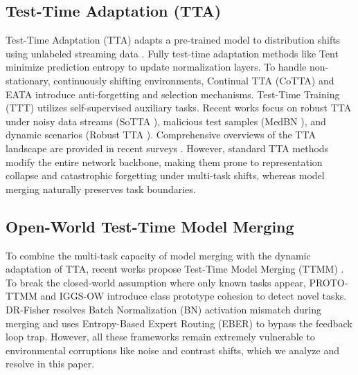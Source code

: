 \documentclass{article}
\theoremstyle{plain}
\theoremstyle{definition}
\theoremstyle{remark}
\begin{document}
\subsection{Test-Time Adaptation (TTA)}
Test-Time Adaptation (TTA) adapts a pre-trained model to distribution shifts using unlabeled streaming data \cite{wang2021tent, niu2022efficient}. Fully test-time adaptation methods like Tent \cite{wang2021tent} minimize prediction entropy to update normalization layers. To handle non-stationary, continuously shifting environments, Continual TTA (CoTTA) \cite{wang2022continual_cotta} and EATA \cite{niu2022efficient_eata} introduce anti-forgetting and selection mechanisms. Test-Time Training (TTT) \cite{sun2020test_ttt} utilizes self-supervised auxiliary tasks. Recent works focus on robust TTA under noisy data streams (SoTTA \cite{gong2023sotta}), malicious test samples (MedBN \cite{Park_2024_CVPR}), and dynamic scenarios (Robust TTA \cite{yuan2023robust_dynamic}). Comprehensive overviews of the TTA landscape are provided in recent surveys \cite{liang2024comprehensive, xiao2024beyond, wang2023search}. However, standard TTA methods modify the entire network backbone, making them prone to representation collapse and catastrophic forgetting under multi-task shifts, whereas model merging naturally preserves task boundaries.

\subsection{Open-World Test-Time Model Merging}
To combine the multi-task capacity of model merging with the dynamic adaptation of TTA, recent works propose Test-Time Model Merging (TTMM) \cite{zhao2024dynamic, yang2024adamerging}. To break the closed-world assumption where only known tasks appear, PROTO-TTMM \cite{proto_ttmm} and IGGS-OW \cite{iggs_ow} introduce class prototype cohesion to detect novel tasks. DR-Fisher \cite{dr_fisher} resolves Batch Normalization (BN) activation mismatch during merging and uses Entropy-Based Expert Routing (EBER) to bypass the feedback loop trap. However, all these frameworks remain extremely vulnerable to environmental corruptions like noise and contrast shifts, which we analyze and resolve in this paper.
\end{document}
